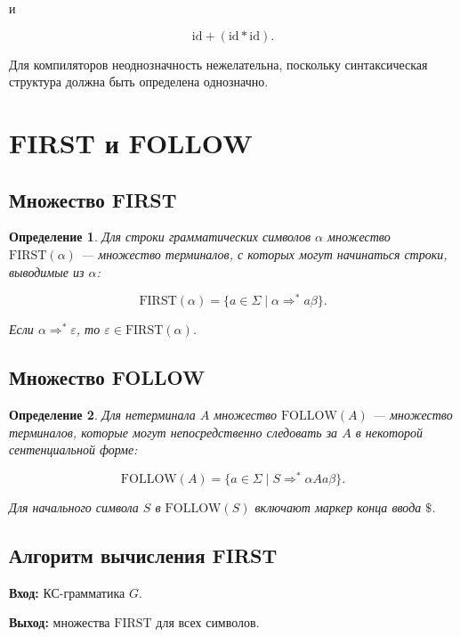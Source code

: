 \documentclass[12pt,a4paper]{article}
\newtheorem{definition}{Определение}
\begin{document}
и

\[
\mathrm{id}+(\mathrm{id}*\mathrm{id}).
\]

Для компиляторов неоднозначность нежелательна, поскольку синтаксическая структура должна быть определена однозначно.

\section{FIRST и FOLLOW}

\subsection{Множество FIRST}

\begin{definition}
Для строки грамматических символов $\alpha$ множество $\mathrm{FIRST}(\alpha)$ --- множество терминалов, с которых могут начинаться строки, выводимые из $\alpha$:

\[
\mathrm{FIRST}(\alpha)
=
\{a \in \Sigma \mid \alpha \Rightarrow^* a\beta\}.
\]

Если $\alpha \Rightarrow^* \varepsilon$, то $\varepsilon \in \mathrm{FIRST}(\alpha)$.
\end{definition}

\subsection{Множество FOLLOW}

\begin{definition}
Для нетерминала $A$ множество $\mathrm{FOLLOW}(A)$ --- множество терминалов, которые могут непосредственно следовать за $A$ в некоторой сентенциальной форме:

\[
\mathrm{FOLLOW}(A)
=
\{a \in \Sigma \mid S \Rightarrow^* \alpha A a \beta\}.
\]

Для начального символа $S$ в $\mathrm{FOLLOW}(S)$ включают маркер конца ввода $\$$.
\end{definition}

\subsection{Алгоритм вычисления FIRST}

\textbf{Вход:} КС-грамматика $G$.

\textbf{Выход:} множества $\mathrm{FIRST}$ для всех символов.
\end{document}
